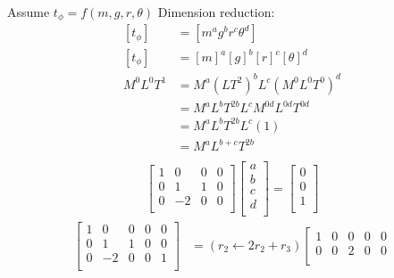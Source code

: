 \documentclass[
	date={August 26{,} 2024}
]{math486notes}
\begin{document}
\begin{example}[Pendulum]
	Assume $t_{\phi} = f(m, g, r, \theta)$
	Dimension reduction:
	\begin{equation*}
	\begin{aligned}
		[t_{\phi}] &= [m^{a}g^{b}r^{c}\theta^{d}]\\
		[t_{\phi}] &= [m]^{a}[g]^{b}[r]^{c}[\theta]^{d}\\
		M^{0}L^{0}T^{1} &= M^{a}\left( LT^{2} \right)^{b} L^{c} \left( M^{0}L^{0}T^{0} \right)^{d}\\
						&= M^{a}L^{b}T^{2b}L^{c} M^{0d}L^{0d}T^{0d}\\
						&= M^{a}L^{b}T^{2b}L^{c} (1)\\
						&= M^{a}L^{b+c}T^{2b}\\
	\end{aligned}
	\end{equation*}
	\begin{equation*}
	\begin{aligned}
		\left[ \begin{array}{cccc}
			 1 & 0 & 0 & 0\\
			 0 & 1 & 1 & 0\\
			0 & -2 & 0 & 0\\
		\end{array} \right]\left[ \begin{array}{c}
			a\\
			b\\
			c\\
			d\\
		\end{array} \right] = \left[ \begin{array}{c}
			0\\
			0\\
			1\\
		\end{array} \right]
	\end{aligned}
	\end{equation*}
	\begin{equation*}
	\begin{aligned}
		\left[ \begin{array}{cccc|c}
			1 &  0 & 0 & 0 & 0\\
			0 &  1 & 1 & 0 & 0\\
			0 & -2 & 0 & 0 & 1\\
		\end{array} \right]
		&= \left( r_{2} \gets 2r_{2} + r_{3} \right)\left[ \begin{array}{cccc|c}
			1 &  0 & 0 & 0 & 0\\
			0 &  0 & 2 & 0 & 0\\

\end{array}
\end{aligned}
\end{equation*}
\end{example}
\end{document}
